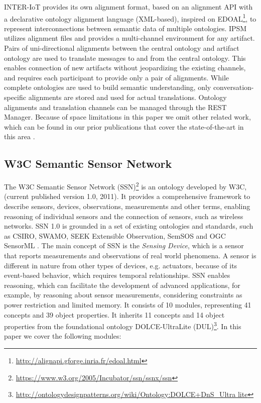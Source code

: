\documentclass{sig-alternate-05-2015}
\begin{document}
INTER-IoT provides its own alignment format, based on an alignment API with a declarative ontology alignment language (XML-based), inspired on  EDOAL\footnote{\url{http://alignapi.gforge.inria.fr/edoal.html}}, to represent interconnections between semantic data of multiple ontologies. IPSM utilizes alignment files and provides a multi-channel environment for any artifact. Pairs of uni-directional alignments between the central ontology and artifact ontology are used to translate messages to and from the central ontology. This enables connection of new artifacts without jeopardizing the existing channels, and requires each participant to provide only a pair of alignments. While complete ontologies are used to build semantic understanding, only conversation-specific alignments are stored and used for actual translations. Ontology alignments and translation channels can be managed through the REST Manager. Because of space limitations in this paper we omit other related work, which can be found in our prior publications that cover the state-of-the-art in this area \cite{Ganzha2017a,Ganzha2016a,Ganzha2015,Ganzha2016}.


\subsection{W3C Semantic Sensor Network}
The W3C Semantic Sensor Network (SSN)\footnote{\url{https://www.w3.org/2005/Incubator/ssn/ssnx/ssn}} \cite{Compton2012} is an ontology developed by W3C, (current published version 1.0, 2011). It provides a comprehensive framework to describe sensors, devices, observations, measurements and other terms, enabling reasoning of individual sensors and the connection of sensors, such as wireless networks. SSN 1.0 is grounded in a set of existing ontologies and standards, such as CSIRO, SWAMO, SEEK Extensible Observation, SemSOS and OGC SensorML \cite{Ganzha2016a}. The main concept of SSN is the \textit{Sensing Device}, which is a sensor that reports measurements and observations of real world phenomena. A sensor is different in nature from other types of devices, e.g. actuators, because of its event-based behavior, which requires temporal relationships. SSN enables reasoning, which can facilitate the development of advanced applications, for example, by reasoning about sensor measurements, considering constraints as power restriction and limited memory. It consists of 10 modules, representing 41 concepts and 39 object properties. It inherits 11 concepts and 14 object properties from the foundational ontology DOLCE-UltraLite (DUL)\footnote{\url{http://ontologydesignpatterns.org/wiki/Ontology:DOLCE+DnS\_Ultra lite}}. In this paper we cover the following modules:
\end{document}
